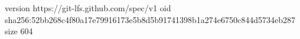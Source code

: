 version https://git-lfs.github.com/spec/v1
oid sha256:52bb268c4f80a17e79916173e5b8d5b91741398b1a274e6750c844d5734eb287
size 604
